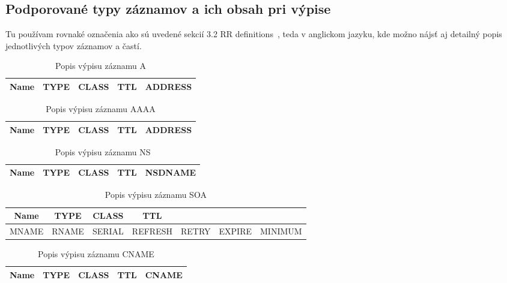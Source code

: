 \subsection{Podporované typy záznamov a ich obsah pri výpise}
Tu používam rovnaké označenia ako sú uvedené sekcií 3.2 RR definitions~\cite{RFC1035}, teda v anglickom jazyku, kde možno nájsť aj detailný popis jednotlivých typov záznamov a častí.
\begin{table}[!ht]
    \centering
    \begin{tabular}{|c|c|c|c|c|}
        \hline
        Name & TYPE & CLASS & TTL & ADDRESS \\
        \hline
    \end{tabular}
    \caption{Popis výpisu záznamu A}
\end{table}

\begin{table}[!ht]
    \centering
    \begin{tabular}{|c|c|c|c|c|}
        \hline
        Name & TYPE & CLASS & TTL & ADDRESS \\
        \hline
    \end{tabular}
    \caption{Popis výpisu záznamu AAAA}
\end{table}

\begin{table}[!ht]
    \centering
    \begin{tabular}{|c|c|c|c|c|}
        \hline
        Name & TYPE & CLASS & TTL & NSDNAME \\
        \hline
    \end{tabular}
    \caption{Popis výpisu záznamu NS}
\end{table}

\begin{table}[!ht]
    \centering
    \begin{tabular}{|c|c|c|c|c|c|c|}
        \hline
        Name & TYPE & CLASS & TTL &&&\\
        \hline
        MNAME & RNAME & SERIAL & REFRESH & RETRY & EXPIRE & MINIMUM\\
        \hline
    \end{tabular}
    \caption{Popis výpisu záznamu SOA}
\end{table}

\begin{table}[!ht]
    \centering
    \begin{tabular}{|c|c|c|c|c|}
        \hline
        Name & TYPE & CLASS & TTL & CNAME \\
        \hline
    \end{tabular}
    \caption{Popis výpisu záznamu CNAME}
\end{table}

